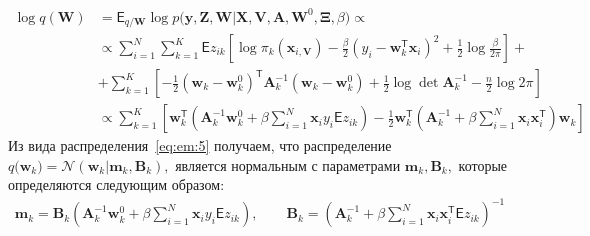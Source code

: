 \documentclass[12pt, twoside]{article}
\numberwithin{equation}{section}
\begin{document}
\begin{equation}
\label{eq:em:5}
\begin{aligned}
\log q\left(\textbf{W}\right) &= \mathsf{E}_{q/\textbf{W}}\log p\bigr(\mathbf{y}, \mathbf{Z}, \mathbf{W}|\mathbf{X}, \mathbf{V}, \textbf{A}, \textbf{W}^{0}, \bm{\Xi}, \beta\bigr) \propto\\
&\propto \sum_{i=1}^{N}\sum_{k=1}^{K}\mathsf{E}z_{ik}\left[\log\pi_{k}\left(\textbf{x}_{i, \textbf{V}}\right) - \frac{\beta}{2}\left(y_{i} - \textbf{w}_{k}^{\mathsf{T}}\textbf{x}_{i}\right)^{2} + \frac{1}{2}\log\frac{\beta}{2\pi}\right] + \\
&+ \sum_{k=1}^{K}\left[-\frac{1}{2}\left(\textbf{w}_{k} - \textbf{w}_{k}^{0}\right)^{\mathsf{T}}\textbf{A}_{k}^{-1}\left(\textbf{w}_{k} - \textbf{w}_{k}^{0}\right) + \frac{1}{2}\log\det\textbf{A}^{-1}_{k} - \frac{n}{2}\log2\pi\right] \\
&\propto \sum_{k=1}^{K}\left[\textbf{w}_{k}^{\mathsf{T}}\left(\textbf{A}_{k}^{-1}\textbf{w}_{k}^{0}+\beta\sum_{i=1}^{N}\textbf{x}_{i}y_{i}\mathsf{E}z_{ik}\right)-\frac{1}{2}\textbf{w}_{k}^{\mathsf{T}}\left(\textbf{A}_{k}^{-1}+\beta\sum_{i=1}^{N}\textbf{x}_{i}\textbf{x}_{i}^{\mathsf{T}}\right)\textbf{w}_{k}\right]
\end{aligned}
\end{equation}
Из вида распределения~\eqref{eq:em:5} получаем, что распределение $q\bigr(\mathbf{w}_{k}\bigr) = \mathcal{N}\left(\mathbf{w}_{k}| \mathbf{m}_{k}, \mathbf{B}_k\right),$ является нормальным с параметрами $\mathbf{m}_k, \mathbf{B}_k,$ которые определяются следующим образом:
\begin{equation}
\label{eq:em:6}
\begin{aligned}
\mathbf{m}_{k} = \mathbf{B}_{k}\left(\mathbf{A}_{k}^{-1}\mathbf{w}_{k}^{0}+\beta\sum_{i=1}^{N}\mathbf{x}_{i}y_{i}\mathsf{E}z_{ik}\right), \qquad \mathbf{B}_{k} = \left(\mathbf{A}_{k}^{-1}+\beta\sum_{i=1}^{N}\mathbf{x}_{i}\mathbf{x}_{i}^{\mathsf{T}}\mathsf{E}z_{ik}\right)^{-1} 
\end{aligned}
\end{equation}
\end{document}
